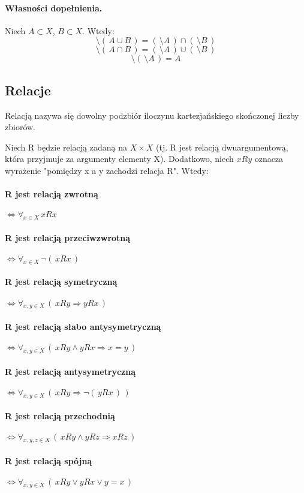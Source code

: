         \paragraph{Własności dopełnienia.}
        Niech $A \subset X$, $B \subset X$. Wtedy:
        \begin{equation*}
            \setminus(\,A \cup B\,) = (\,\setminus A\,) \cap (\,\setminus B\,)
        \end{equation*}
        \begin{equation*}
            \setminus(\,A \cap B\,) = (\,\setminus A\,) \cup (\,\setminus B\,)
        \end{equation*}
        \begin{equation*}
            \setminus(\,\setminus A\,) = A
        \end{equation*}

    \subsection{Relacje}
    \begin{definition}
        Relacją nazywa się dowolny podzbiór iloczynu kartezjańskiego skończonej liczby zbiorów.
    \end{definition}

Niech R będzie relacją zadaną na $X \times X$ (tj. R jest relacją dwuargumentową, która przyjmuje za argumenty elementy X). Dodatkowo, niech $xRy$ oznacza wyrażenie "pomiędzy x a y zachodzi relacja R". Wtedy:
\paragraph{R jest relacją zwrotną} $\Leftrightarrow \forall_{x \in X} \, xRx$
\paragraph{R jest relacją przeciwzwrotną} $\Leftrightarrow \forall_{x \in X} \, \neg (\,xRx\,)$
\paragraph{R jest relacją symetryczną} $\Leftrightarrow \forall_{x,y \in X} \, (\,xRy \Longrightarrow yRx\,)$
\paragraph{R jest relacją słabo antysymetryczną} $\Leftrightarrow \forall_{x,y \in X} \, (\,xRy \wedge yRx \Longrightarrow x = y\,)$
\paragraph{R jest relacją antysymetryczną} $\Leftrightarrow \forall_{x,y \in X} \, (\,xRy \Longrightarrow \neg(\,yRx\,)\,)$
\paragraph{R jest relacją przechodnią} $\Leftrightarrow \forall_{x,y,z \in X} \, (\,xRy \wedge yRz \Longrightarrow xRz\,)$
\paragraph{R jest relacją spójną} $\Leftrightarrow \forall_{x,y \in X} \, (\,xRy \vee yRx \vee y = x\,)$
